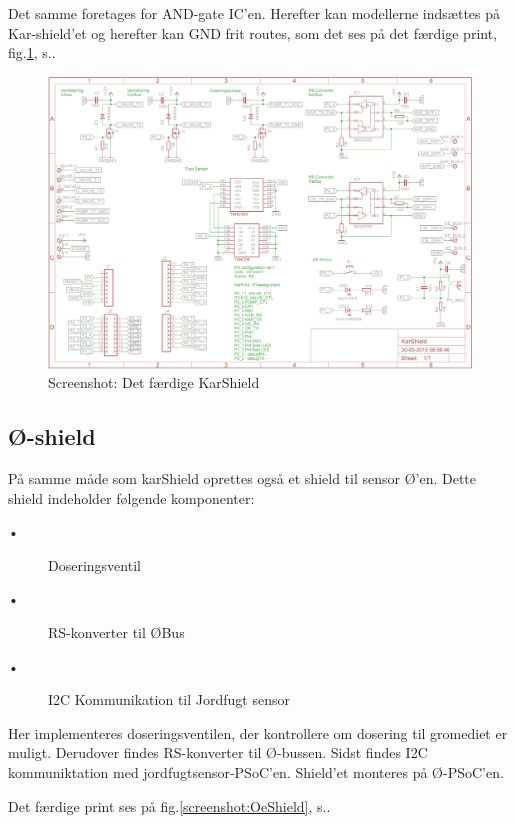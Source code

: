 Det samme foretages for AND-gate IC'en. 
Herefter kan modellerne indsættes på Kar-shield'et og herefter kan GND frit routes, som det ses på det færdige print, fig.\ref{screenshot:karShield}, s.\pageref{screenshot:karShield}.


\newpage
\begin{figure}[H]
	\centering
	\includegraphics[scale=1]{../Hardware/Shields/Screenshots/KarShield}
	\caption{Screenshot: Det færdige KarShield}
	\label{screenshot:karShield}
\end{figure}




\newpage
\subsection{Ø-shield}

På samme måde som karShield oprettes også et shield til sensor Ø'en. Dette shield indeholder følgende komponenter: 

\begin{description}
 \item[•] Doseringsventil
 \item[•] RS-konverter til ØBus
 \item[•] I2C Kommunikation til Jordfugt sensor
\end{description}

Her implementeres doseringsventilen, der kontrollere om dosering til gromediet er muligt. Derudover findes RS-konverter til Ø-bussen. Sidst findes I2C kommuniktation med jordfugtsensor-PSoC'en. 
Shield'et monteres på Ø-PSoC'en.

Det færdige print ses på fig.\ref{screenshot:OeShield}, s.\pageref{screenshot:OeShield}.

